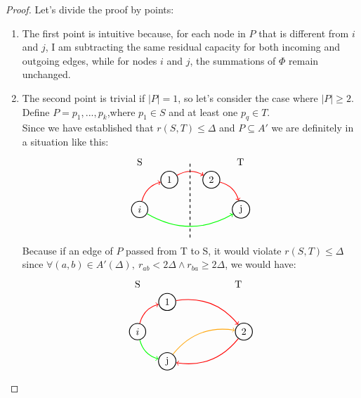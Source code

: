     \begin{proof}
        Let's divide the proof by points:
        \begin{enumerate}
            \item The first point is intuitive because, for each node in $P$ that is different from $i$ and $j$, I am subtracting the same residual capacity for both incoming and outgoing edges, while for nodes $i$ and $j$, the summations of $\Phi$ remain unchanged.
            \item The second point is trivial if $|P|= 1$, so let's consider the case where $|P|\ge 2$. Define $P = p_1, ..., p_k$,where $p_1 \in S$ and at least one $p_q\in T$.\\
            Since we have established that $r(S,T) \le \Delta$ and $P\subseteq A'$ we are definitely in a situation like this:
                \[\begin{tikzpicture}[node distance={15mm}, thick , main/.style = {draw, circle}] 
                    \node[main] (0) {$i$};
                    \node[main] (1) [above right of = 0] {1};
                    \node[main] (2) [right of = 1] {2};
                    \node[main] (3) [below right of = 2] {j};
                    \node at (0,1.7) {S};
                    \node at (3.6,1.7) {T};

                    \draw[->] (0) [red, bend left] to (1);
                    \draw[->] (1) [red, bend left] to (2);
                    \draw[->] (2) [red, bend left] to (3);
                    \draw[->] (0) [green, bend right] to (3);

                    \draw[dashed] (1.8,-1) -- (1.8,1.7);
                \end{tikzpicture}\]
                Because if an edge of $P$ passed from T to S, it would violate $r(S,T)\le \Delta$ since $\forall (a,b)\in A'(\Delta),\ r_{ab} < 2\Delta \land r_{ba}\ge 2\Delta$, we would have:
                \[\begin{tikzpicture}[node distance={15mm}, thick , main/.style = {draw, circle}] 
                    \node[main] (0) {$i$};
                    \node[main] (1) [above right of = 0] {1};
                    \node[main] (2) at (3.8,0) {2};
                    \node[main] (3) [below right of = 0] {j};
                    \node at (0,1.7) {S};
                    \node at (3.6,1.7) {T};

                    \draw[->] (0) [red,bend left] to (1);
                    \draw[->] (1) [red,bend left] to (2);
                    \draw[->] (2) [red,bend left] to (3);
                    \draw[->] (3) [thick = 1.5, darktangerine, bend left] to (2);
                    \draw[->] (0) [green, bend right] to (3);


\end{tikzpicture}\]
\end{enumerate}
\end{proof}
